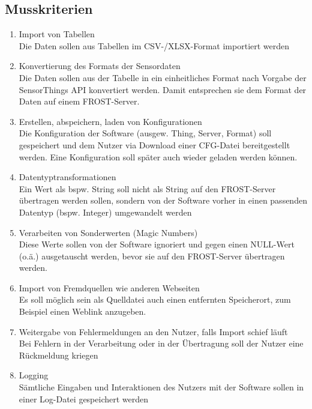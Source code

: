 \documentclass[12 pt]{article}
\begin{document}
	\subsection{Musskriterien}
	\begin{enumerate}
		\item Import von Tabellen \\
		Die Daten sollen aus Tabellen im CSV-/XLSX-Format importiert werden
		\item Konvertierung des Formats der Sensordaten \\
		Die Daten sollen aus der Tabelle in ein einheitliches Format nach Vorgabe der SensorThings API konvertiert werden. Damit entsprechen sie dem Format der Daten auf einem FROST-Server.
		\item Erstellen, abspeichern, laden von Konfigurationen \\
		Die Konfiguration der Software (ausgew. Thing, Server, Format) soll gespeichert und dem Nutzer via Download einer CFG-Datei bereitgestellt werden. Eine Konfiguration soll später auch wieder geladen werden können.
		\item Datentyptransformationen \\
		Ein Wert als bspw. String soll nicht als String auf den FROST-Server übertragen werden sollen, sondern von der Software vorher in einen passenden Datentyp (bspw. Integer) umgewandelt werden
		\item Verarbeiten von Sonderwerten (Magic Numbers) \\
		Diese Werte sollen von der Software ignoriert und gegen einen NULL-Wert (o.ä.) ausgetauscht werden, bevor sie auf den FROST-Server übertragen werden.
		\item Import von Fremdquellen wie anderen Webseiten \\
		Es soll möglich sein als Quelldatei auch einen entfernten Speicherort, zum Beispiel einen Weblink  anzugeben.
		\item Weitergabe von Fehlermeldungen an den Nutzer, falls Import schief läuft \\
		Bei Fehlern in der Verarbeitung oder in der Übertragung soll der Nutzer eine Rückmeldung kriegen
		\item Logging \\
		Sämtliche Eingaben und Interaktionen des Nutzers mit der Software sollen in einer Log-Datei gespeichert werden
	\end{enumerate}
	
\end{document}
